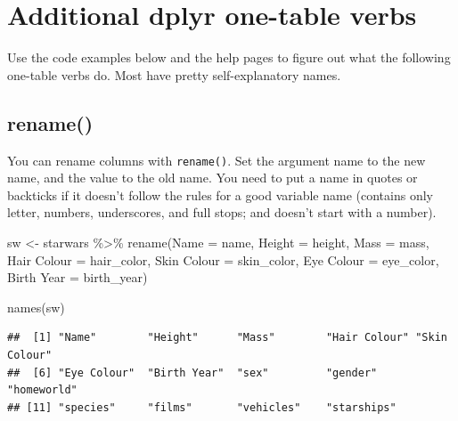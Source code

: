 \documentclass[
  oneside]{book}
\newenvironment{Shaded}{\begin{snugshade}}{\end{snugshade}}
\newcommand{\AttributeTok}[1]{\textcolor[rgb]{0.77,0.63,0.00}{#1}}
\newcommand{\FunctionTok}[1]{\textcolor[rgb]{0.00,0.00,0.00}{#1}}
\newcommand{\NormalTok}[1]{#1}
\newcommand{\OtherTok}[1]{\textcolor[rgb]{0.56,0.35,0.01}{#1}}
\newcommand{\SpecialCharTok}[1]{\textcolor[rgb]{0.00,0.00,0.00}{#1}}
\newcommand{\StringTok}[1]{\textcolor[rgb]{0.31,0.60,0.02}{#1}}
\begin{document}
\hypertarget{additional-dplyr-one-table-verbs}{%
\section{Additional dplyr one-table verbs}\label{additional-dplyr-one-table-verbs}}

Use the code examples below and the help pages to figure out what the following one-table verbs do. Most have pretty self-explanatory names.

\hypertarget{rename}{%
\subsection{rename()}\label{rename}}

You can rename columns with \texttt{rename()}. Set the argument name to the new name, and the value to the old name. You need to put a name in quotes or backticks if it doesn't follow the rules for a good variable name (contains only letter, numbers, underscores, and full stops; and doesn't start with a number).

\begin{Shaded}
\begin{Highlighting}[]
\NormalTok{sw }\OtherTok{\textless{}{-}}\NormalTok{ starwars }\SpecialCharTok{\%\textgreater{}\%}
  \FunctionTok{rename}\NormalTok{(}\AttributeTok{Name =}\NormalTok{ name,}
         \AttributeTok{Height =}\NormalTok{ height,}
         \AttributeTok{Mass =}\NormalTok{ mass,}
         \StringTok{\textasciigrave{}}\AttributeTok{Hair Colour}\StringTok{\textasciigrave{}} \OtherTok{=}\NormalTok{ hair\_color,}
         \StringTok{\textasciigrave{}}\AttributeTok{Skin Colour}\StringTok{\textasciigrave{}} \OtherTok{=}\NormalTok{ skin\_color,}
         \StringTok{\textasciigrave{}}\AttributeTok{Eye Colour}\StringTok{\textasciigrave{}} \OtherTok{=}\NormalTok{ eye\_color,}
         \StringTok{\textasciigrave{}}\AttributeTok{Birth Year}\StringTok{\textasciigrave{}} \OtherTok{=}\NormalTok{ birth\_year)}

\FunctionTok{names}\NormalTok{(sw)}
\end{Highlighting}
\end{Shaded}

\begin{verbatim}
##  [1] "Name"        "Height"      "Mass"        "Hair Colour" "Skin Colour"
##  [6] "Eye Colour"  "Birth Year"  "sex"         "gender"      "homeworld"  
## [11] "species"     "films"       "vehicles"    "starships"
\end{verbatim}
\end{document}
